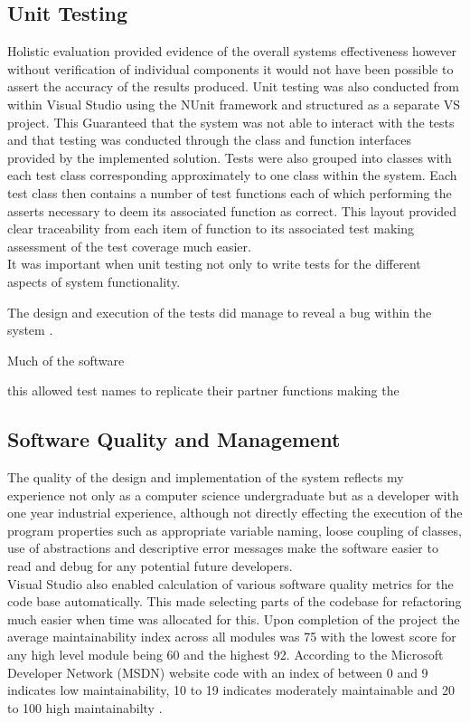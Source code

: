 \subsection{Unit Testing}
Holistic evaluation provided evidence of the overall systems effectiveness however without verification of individual components it would not have been possible to assert the accuracy of the results produced. Unit testing was also conducted from within Visual Studio using the NUnit framework and structured as a separate VS project. This Guaranteed that the system was not able to interact with the tests and that testing was conducted through the class and function interfaces provided by the implemented solution. Tests were also grouped into classes with each test class corresponding approximately to one class within the system. Each test class then contains a number of test functions each of which performing the asserts necessary to deem its associated function as correct. This layout provided clear traceability from each item of function to its associated test making assessment of the test coverage much easier. \\

It was important when unit testing not only to write tests for the different aspects of system functionality.

The design and execution of the tests did manage to reveal a bug within the system . 

Much of the software

 this allowed test names to replicate their partner functions making the 

\subsection{Software Quality and Management}
The quality of the design and implementation of the system reflects my experience not only as a computer science undergraduate but as a developer with one year industrial experience, although not directly effecting the execution of the program properties such as appropriate variable naming, loose coupling of classes, use of abstractions and descriptive error messages make the software easier to read and debug for any potential future developers. \\

\noindent
Visual Studio also enabled calculation of various software quality metrics for the code base automatically. This made selecting parts of the codebase for refactoring much easier when time was allocated for this. Upon completion of the project the average maintainability index across all modules was 75 with the lowest score for any high level module being 60 and the highest 92. According to the Microsoft Developer Network (MSDN) website code with an index of between 0 and 9 indicates low maintainability, 10 to 19 indicates moderately maintainable and 20 to 100 high maintainabilty \cite{VisualStudioMaintainIndex}. \\

